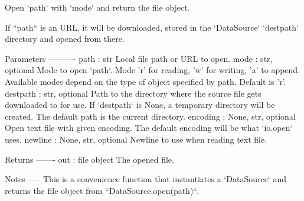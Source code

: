 \begin{DoxyVerb}Open `path` with `mode` and return the file object.

If ``path`` is an URL, it will be downloaded, stored in the
`DataSource` `destpath` directory and opened from there.

Parameters
----------
path : str
    Local file path or URL to open.
mode : str, optional
    Mode to open `path`. Mode 'r' for reading, 'w' for writing, 'a' to
    append. Available modes depend on the type of object specified by
    path.  Default is 'r'.
destpath : str, optional
    Path to the directory where the source file gets downloaded to for
    use.  If `destpath` is None, a temporary directory will be created.
    The default path is the current directory.
encoding : {None, str}, optional
    Open text file with given encoding. The default encoding will be
    what `io.open` uses.
newline : {None, str}, optional
    Newline to use when reading text file.

Returns
-------
out : file object
    The opened file.

Notes
-----
This is a convenience function that instantiates a `DataSource` and
returns the file object from ``DataSource.open(path)``.\end{DoxyVerb}
 